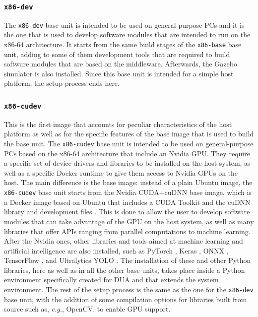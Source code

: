 \subsubsection{\texttt{x86-dev}}
\label{sec:dua_base_units_x86-dev}
The \texttt{x86-dev} base unit is intended to be used on general-purpose PCs and it is the one that is used to develop software modules that are intended to run on the x86-64 architecture. It starts from the same build stages of the \texttt{x86-base} base unit, adding to some of them development tools that are required to build software modules that are based on the \ROS middleware. Afterwards, the Gazebo simulator is also installed. Since this base unit is intended for a simple host platform, the setup process ends here.

\subsubsection{\texttt{x86-cudev}}
\label{sec:dua_base_units_x86-cudev}
This is the first image that accounts for peculiar characteristics of the host platform as well as for the specific features of the base image that is used to build the base unit. The \texttt{x86-cudev} base unit is intended to be used on general-purpose PCs based on the x86-64 architecture that include an Nvidia GPU. They require a specific set of device drivers and libraries to be installed on the host system, as well as a specific Docker runtime to give them access to Nvidia GPUs on the host. The main difference is the base image: instead of a plain Ubuntu image, the \texttt{x86-cudev} base unit starts from the Nvidia CUDA+cuDNN base image, which is a Docker image based on Ubuntu that includes a CUDA Toolkit \cite{nvidia_cuda_nodate} and the cuDNN library and development files \cite{nvidia_cuda_nodate-1}. This is done to allow the user to develop software modules that can take advantage of the GPU on the host system, as well as many libraries that offer APIs ranging from parallel computations to machine learning. After the Nvidia ones, other libraries and tools aimed at machine learning and artificial intelligence are also installed, such as PyTorch \cite{pytorch_foundation_pytorch_nodate}, Keras \cite{chollet_keras_nodate}, ONNX \cite{linux_foundation_onnx_nodate}, TensorFlow \cite{google_brain_team_tensorflow_nodate}, and Ultralytics YOLO \cite{ultralytics_inc_ultralytics_nodate}. The installation of these and other Python libraries, here as well as in all the other base units, takes place inside a Python environment specifically created for DUA and that extends the system environment. The rest of the setup process is the same as the one for the \texttt{x86-dev} base unit, with the addition of some compilation options for libraries built from source such as, \emph{e.g.}, OpenCV, to enable GPU support.


